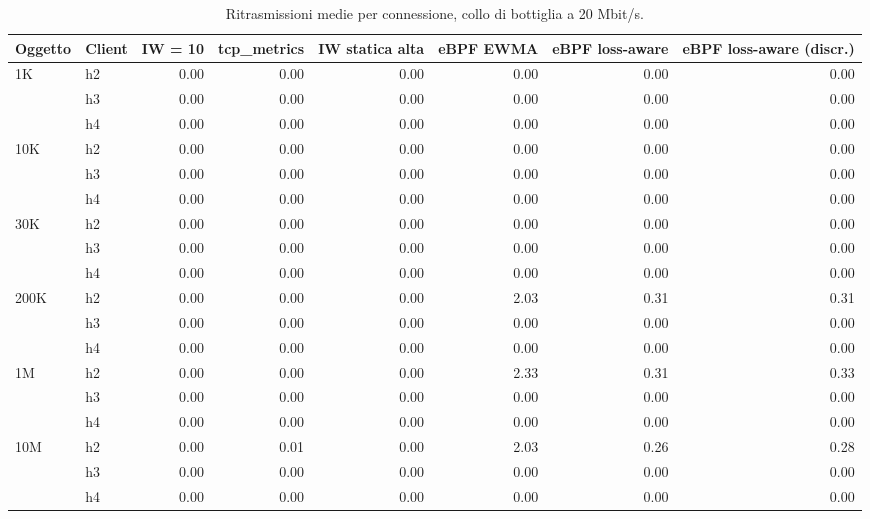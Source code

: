 \begin{table}[htbp]
  \centering
  \caption{Ritrasmissioni medie per connessione, collo di bottiglia a 20 Mbit/s.}
  \label{tab:retrans-20}
  \begin{tabular}{llrrrrrr}
    \toprule
    Oggetto & Client & IW = 10 & tcp\_metrics & IW statica alta & eBPF EWMA & eBPF loss-aware & eBPF loss-aware (discr.) \\
    \midrule
    1K & h2 & 0.00 & 0.00 & 0.00 & 0.00 & 0.00 & 0.00 \\
     & h3 & 0.00 & 0.00 & 0.00 & 0.00 & 0.00 & 0.00 \\
     & h4 & 0.00 & 0.00 & 0.00 & 0.00 & 0.00 & 0.00 \\
    \addlinespace
    10K & h2 & 0.00 & 0.00 & 0.00 & 0.00 & 0.00 & 0.00 \\
     & h3 & 0.00 & 0.00 & 0.00 & 0.00 & 0.00 & 0.00 \\
     & h4 & 0.00 & 0.00 & 0.00 & 0.00 & 0.00 & 0.00 \\
    \addlinespace
    30K & h2 & 0.00 & 0.00 & 0.00 & 0.00 & 0.00 & 0.00 \\
     & h3 & 0.00 & 0.00 & 0.00 & 0.00 & 0.00 & 0.00 \\
     & h4 & 0.00 & 0.00 & 0.00 & 0.00 & 0.00 & 0.00 \\
    \addlinespace
    200K & h2 & 0.00 & 0.00 & 0.00 & 2.03 & 0.31 & 0.31 \\
     & h3 & 0.00 & 0.00 & 0.00 & 0.00 & 0.00 & 0.00 \\
     & h4 & 0.00 & 0.00 & 0.00 & 0.00 & 0.00 & 0.00 \\
    \addlinespace
    1M & h2 & 0.00 & 0.00 & 0.00 & 2.33 & 0.31 & 0.33 \\
     & h3 & 0.00 & 0.00 & 0.00 & 0.00 & 0.00 & 0.00 \\
     & h4 & 0.00 & 0.00 & 0.00 & 0.00 & 0.00 & 0.00 \\
    \addlinespace
    10M & h2 & 0.00 & 0.01 & 0.00 & 2.03 & 0.26 & 0.28 \\
     & h3 & 0.00 & 0.00 & 0.00 & 0.00 & 0.00 & 0.00 \\
     & h4 & 0.00 & 0.00 & 0.00 & 0.00 & 0.00 & 0.00 \\
    \bottomrule
  \end{tabular}
\end{table}
